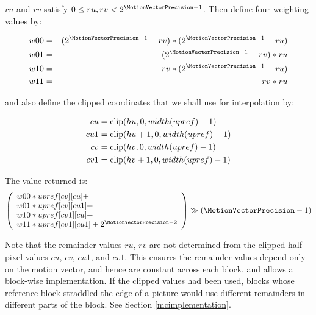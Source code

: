 $ru$ and $rv$ satisfy $0\leq ru,rv <2^{\MotionVectorPrecision-1}$. Then define four weighting
values by:

\begin{eqnarray*}
w00 & = & (2^{\MotionVectorPrecision-1}-rv)*(2^{\MotionVectorPrecision-1}-ru)\\
w01 & = & (2^{\MotionVectorPrecision-1}-rv)*ru\\
w10 & = & rv*(2^{\MotionVectorPrecision-1}-ru)\\
w11 & = & rv*ru
\end{eqnarray*}

and also define the clipped coordinates that we shall use for interpolation by:

\begin{eqnarray*}
cu & = \operatorname{clip}(hu, 0, width(upref)-1) \\
cu1 & = \operatorname{clip}(hu+1, 0, width(upref)-1) \\
cv & = \operatorname{clip}(hv, 0, width(upref)-1) \\
cv1 & = \operatorname{clip}(hv+1, 0, width(upref)-1)
\end{eqnarray*}

The value returned is:
\[
\left(
\begin{array}{l}
w00*upref[cv][cu]+\\
w01*upref[cv][cu1]+\\
w10*upref[cv1][cu]+\\
w11*upref[cv1][cu1]+2^{\MotionVectorPrecision-2}
\end{array}
\right)\gg(\MotionVectorPrecision-1)\]

\begin{informative}
Note that the remainder values $ru$, $rv$ are not determined from the clipped
half-pixel values $cu$, $cv$, $cu1$, and $cv1$. This ensures the remainder
values depend only on the motion vector, and hence are constant across
each block, and allows a block-wise implementation. If the clipped values 
had been used, blocks whose reference
block straddled the edge of a picture would use different remainders in
different parts of the block. See Section \ref{mcimplementation}.
\end{informative}


